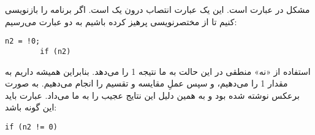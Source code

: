 \section{}
\paragraph{}\label{answer:25}
مشکل در عبارت  است. این یک عبارت انتصاب درون یک  است. اگر برنامه را بازنویسی کنیم تا از مختصرنویسی پرهیز کرده باشیم به دو عبارت می‌رسیم:
\begin{LTR}
    \begin{lstlisting}[style=C++Style]
        n2 = !0;
        if (n2)
    \end{lstlisting}
\end{LTR}

استفاده از «نه» منطقی در این حالت  به ما نتیجه 1 را می‌دهد. بنابراین همیشه داریم به  مقدار 1 را می‌دهیم، و سپس عملِ مقایسه و تقسیم را انجام می‌دهیم. \lr{\texttt{!=}} به صورت برعکس \lr{\texttt{=!}} نوشته شده بود و به همین دلیل این نتایج عجیب را به ما می‌داد. عبارت باید این گونه باشد:
\begin{LTR}
    \begin{lstlisting}[style=C++Style]
        if (n2 != 0)
    \end{lstlisting}
\end{LTR}
